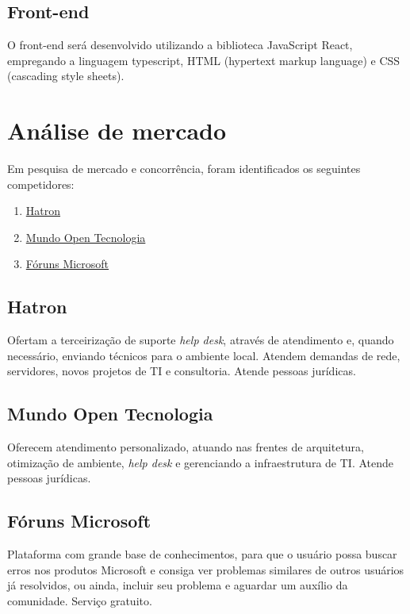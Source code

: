 \documentclass[
    12pt,               %
    openright,          %
    oneside,
    a4paper,            %
    MODELO,             %
    english,            %
    brazil              %
   ]{ifsp-spo-inf-ctds}
\begin{document}
\section{Front-end}

O front-end será desenvolvido utilizando a biblioteca JavaScript React, empregando a linguagem typescript, HTML (hypertext markup language) e CSS (cascading style sheets).
	
\chapter[Análise de mercado]{Análise de mercado}

    Em pesquisa de mercado e concorrência, foram identificados os seguintes competidores:
    
    \begin{enumerate}
        \item \href{https://hatron.com.br/}{Hatron}
        
        \item \href{https://www.mundoopen.com.br/helpdesk-para-empresas-sp-suporte-tecnico-em-ti.html}{Mundo Open Tecnologia}
        
        \item \href{https://answers.microsoft.com/pt-br?auth=1}{Fóruns Microsoft}
    \end{enumerate}
    
    \section{Hatron}
    Ofertam a terceirização de suporte \textit{help desk}, através de atendimento e, quando necessário, enviando técnicos para o ambiente local. Atendem demandas de rede, servidores, novos projetos de TI e consultoria. Atende pessoas jurídicas.
    
    \section{Mundo Open Tecnologia}
    Oferecem atendimento personalizado, atuando nas frentes de arquitetura, otimização de ambiente, \textit{help desk} e gerenciando a infraestrutura de TI. Atende pessoas jurídicas.
    
    \section{Fóruns Microsoft}
    Plataforma com grande base de conhecimentos, para que o usuário possa buscar erros nos produtos Microsoft e consiga ver problemas similares de outros usuários já resolvidos, ou ainda, incluir seu problema e aguardar um auxílio da comunidade. Serviço gratuito.
    
\end{document}
